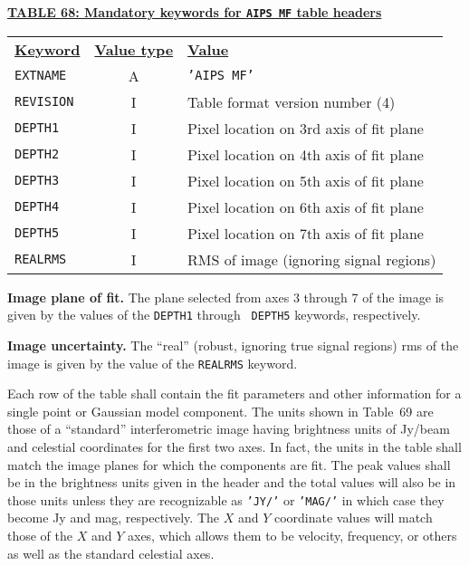 \documentclass[twoside]{article}
\begin{document}
\begin{center}
\underline{\bf{TABLE 68: Mandatory keywords for {\tt AIPS MF} table
    headers}}\\
\begin{tabular}{lcl}
\noalign{\vspace{2pt}} \label{ta:MFkeys}
\underline{{\bf Keyword}} & \underline{\bf{Value type}} &
    \underline{\bf{Value\vphantom{y}}} \\
\noalign{\vspace{2pt}}
{\tt EXTNAME}  & A & {\tt 'AIPS MF'}  \\
{\tt REVISION} & I & Table format version number (4) \\
{\tt DEPTH1}   & I & Pixel location on 3rd axis of fit plane \\
{\tt DEPTH2}   & I & Pixel location on 4th axis of fit plane \\
{\tt DEPTH3}   & I & Pixel location on 5th axis of fit plane \\
{\tt DEPTH4}   & I & Pixel location on 6th axis of fit plane \\
{\tt DEPTH5}   & I & Pixel location on 7th axis of fit plane \\
{\tt REALRMS}  & I & RMS of image (ignoring signal regions)
\end{tabular}
\end{center}

{\bf Image plane of fit.} The plane selected from axes 3 through 7 of
the image is given by the values of the {\tt DEPTH1} through {\tt
  DEPTH5} keywords, respectively.

{\bf Image uncertainty.} The ``real'' (robust, ignoring true signal
regions) rms of the image is given by the value of the {\tt REALRMS}
keyword.

Each row of the table shall contain the fit parameters and other
information for a single point or Gaussian model component.  The units
shown in Table~69 are those of a ``standard'' interferometric image
having brightness units of Jy/beam and celestial coordinates for the
first two axes.  In fact, the units in the table shall match the image
planes for which the components are fit.  The peak values shall be in
the brightness units given in the header and the total values will
also be in those units unless they are recognizable as {\tt 'JY/'} or
{\tt 'MAG/'} in which case they become Jy and mag, respectively.  The
$X$ and $Y$ coordinate values will match those of the $X$ and $Y$
axes, which allows them to be velocity, frequency, or others as well
as the standard celestial axes.
\end{document}
